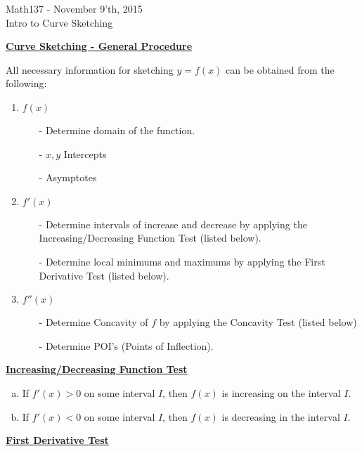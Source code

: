 \documentclass{letter}
\begin{document}
	\begin{center}
		\LARGE Math137 - November 9'th, 2015\\
		\large Intro to Curve Sketching
	\end{center}
	\vspace{0.25 in}
	\underline{\textbf{Curve Sketching - General Procedure}}
	
	All necessary information for sketching $y=f(x)$ can be obtained from the following:
	
	\begin{enumerate}[1)]
		\item $f(x)$
		\begin{itemize}
			\item[-] Determine domain of the function.
			\item[-] $x, y$ Intercepts
			\item[-] Asymptotes
		\end{itemize}
		\item $f'(x)$
		\begin{itemize}
			\item[-] Determine intervals of increase and decrease by applying the Increasing/Decreasing Function Test (listed below).
			\item[-] Determine local minimums and maximums by applying the First Derivative Test (listed below).
		\end{itemize}
		\item $f''(x)$
		\begin{itemize}
			\item[-] Determine Concavity of $f$ by applying the Concavity Test (listed below)
			\item[-] Determine POI's (Points of Inflection).
		\end{itemize}
	\end{enumerate}
	
	\underline{\textbf{Increasing/Decreasing Function Test}}
	\begin{enumerate}[a)]
		\item If $f'(x) > 0$ on some interval $I$, then $f(x)$ is increasing on the interval $I$.
		\item If $f'(x) < 0$ on some interval $I$, then $f(x)$ is decreasing in the interval $I$.
	\end{enumerate}
	\underline{\textbf{First Derivative Test}}
	
\end{document}
